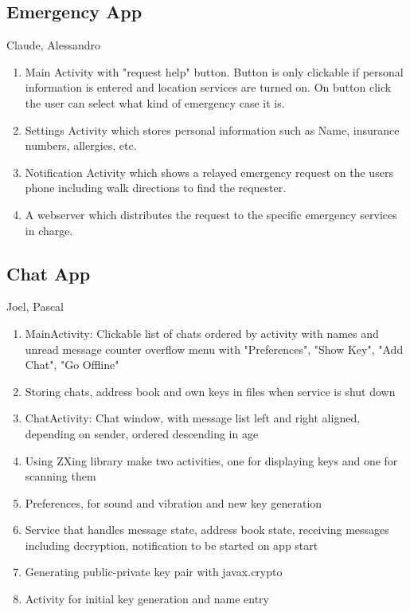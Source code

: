 		
		\subsection{Emergency App}
			Claude, Alessandro
			\begin{enumerate}
				\item Main Activity with "request help" button. Button is only clickable if personal information is entered and location services are turned on. On button click the user can select what kind of emergency case it is.
				\item Settings Activity which stores personal information such as Name, insurance numbers, allergies, etc.
				\item Notification Activity which shows a relayed emergency request on the users phone including walk directions to find the requester.
				\item A webserver which distributes the request to the specific emergency services in charge.
			\end{enumerate}
		
		\subsection{Chat App}
			Joel, Pascal
			\begin{enumerate}
				\item MainActivity: Clickable list of chats ordered by activity with names and unread message counter overflow menu with "Preferences", "Show Key", "Add Chat", "Go Offline"
				\item Storing chats, address book and own keys in files when service is shut down
				\item ChatActivity: Chat window, with message list left and right aligned, depending on sender, ordered descending in age
				\item Using ZXing library make two activities, one for displaying keys and one for scanning them
				\item Preferences, for sound and vibration and new key generation
				\item Service that handles message state, address book state, receiving messages including decryption, notification to be started on app start
				\item Generating public-private key pair with javax.crypto
				\item Activity for initial key generation and name entry
			\end{enumerate}
			